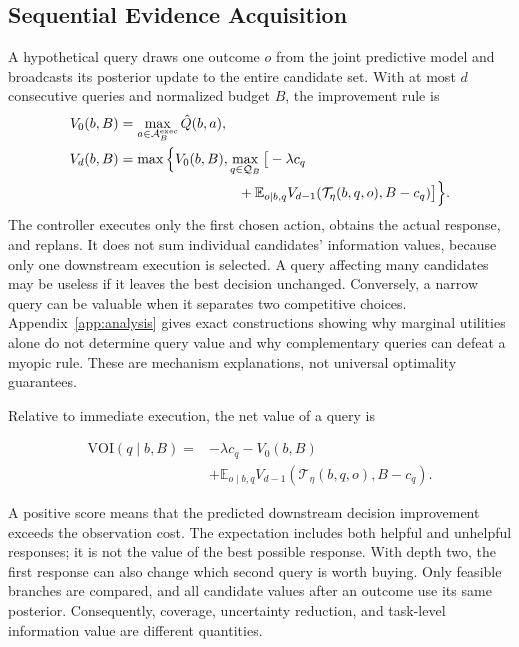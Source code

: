 \documentclass[sigconf,anonymous,review]{acmart}
\newcommand{\E}{\mathbb{E}}
\theoremstyle{zhplain}
\begin{document}
\subsection{Sequential Evidence Acquisition}
A hypothetical query draws one outcome \(o\) from the joint predictive model and broadcasts its posterior update to the entire candidate set. With at most \(d\) consecutive queries and normalized budget \(B\), the improvement rule is
\begin{equation}
\begin{aligned}
V_0(b,B)&=\max_{a\in\mathcal A_B^{\mathrm{exec}}}\hat Q(b,a),\\
V_d(b,B)&=\max\Big\{V_0(b,B),\max_{q\in\mathcal Q_B}\big[-\lambda c_q\\
&\hspace{30mm}+\E_{o\mid b,q}V_{d-1}(\mathcal T_\eta(b,q,o),B-c_q)\big]\Big\}.
\end{aligned}
\label{eq:tree}
\end{equation}
The controller executes only the first chosen action, obtains the actual response, and replans. It does not sum individual candidates' information values, because only one downstream execution is selected. A query affecting many candidates may be useless if it leaves the best decision unchanged. Conversely, a narrow query can be valuable when it separates two competitive choices. Appendix~\ref{app:analysis} gives exact constructions showing why marginal utilities alone do not determine query value and why complementary queries can defeat a myopic rule. These are mechanism explanations, not universal optimality guarantees.

Relative to immediate execution, the net value of a query is

\begin{equation}
\begin{aligned}
\mathrm{VOI}(q\mid b,B)={}&-\lambda c_q-V_0(b,B)\\
&+\E_{o\mid b,q}V_{d-1}(\mathcal T_\eta(b,q,o),B-c_q).
\end{aligned}
\label{eq:voi}
\end{equation}

A positive score means that the predicted downstream decision improvement exceeds the observation cost. The expectation includes both helpful and unhelpful responses; it is not the value of the best possible response. With depth two, the first response can also change which second query is worth buying. Only feasible branches are compared, and all candidate values after an outcome use its same posterior. Consequently, coverage, uncertainty reduction, and task-level information value are different quantities.
\end{document}
